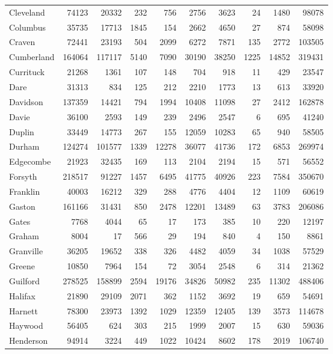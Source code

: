 \documentclass[12pt,]{article}
\begin{document}
\begin{tabular}{lrrrrrrrrr}
Cleveland & 74123 & 20332 & 232 & 756 & 2756 & 3623 & 24 & 1480 & 98078\\
Columbus & 35735 & 17713 & 1845 & 154 & 2662 & 4650 & 27 & 874 & 58098\\
Craven & 72441 & 23193 & 504 & 2099 & 6272 & 7871 & 135 & 2772 & 103505\\
\addlinespace
Cumberland & 164064 & 117117 & 5140 & 7090 & 30190 & 38250 & 1225 & 14852 & 319431\\
Currituck & 21268 & 1361 & 107 & 148 & 704 & 918 & 11 & 429 & 23547\\
Dare & 31313 & 834 & 125 & 212 & 2210 & 1773 & 13 & 613 & 33920\\
Davidson & 137359 & 14421 & 794 & 1994 & 10408 & 11098 & 27 & 2412 & 162878\\
Davie & 36100 & 2593 & 149 & 239 & 2496 & 2547 & 6 & 695 & 41240\\
\addlinespace
Duplin & 33449 & 14773 & 267 & 155 & 12059 & 10283 & 65 & 940 & 58505\\
Durham & 124274 & 101577 & 1339 & 12278 & 36077 & 41736 & 172 & 6853 & 269974\\
Edgecombe & 21923 & 32435 & 169 & 113 & 2104 & 2194 & 15 & 571 & 56552\\
Forsyth & 218517 & 91227 & 1457 & 6495 & 41775 & 40926 & 223 & 7584 & 350670\\
Franklin & 40003 & 16212 & 329 & 288 & 4776 & 4404 & 12 & 1109 & 60619\\
\addlinespace
Gaston & 161166 & 31431 & 850 & 2478 & 12201 & 13489 & 63 & 3783 & 206086\\
Gates & 7768 & 4044 & 65 & 17 & 173 & 385 & 10 & 220 & 12197\\
Graham & 8004 & 17 & 566 & 29 & 194 & 840 & 4 & 150 & 8861\\
Granville & 36205 & 19652 & 338 & 326 & 4482 & 4059 & 34 & 1038 & 57529\\
Greene & 10850 & 7964 & 154 & 72 & 3054 & 2548 & 6 & 314 & 21362\\
\addlinespace
Guilford & 278525 & 158899 & 2594 & 19176 & 34826 & 50982 & 235 & 11302 & 488406\\
Halifax & 21890 & 29109 & 2071 & 362 & 1152 & 3692 & 19 & 659 & 54691\\
Harnett & 78300 & 23973 & 1392 & 1029 & 12359 & 12405 & 139 & 3573 & 114678\\
Haywood & 56405 & 624 & 303 & 215 & 1999 & 2007 & 15 & 630 & 59036\\
Henderson & 94914 & 3224 & 449 & 1022 & 10424 & 8602 & 178 & 2019 & 106740\\

\end{tabular}
\end{document}
